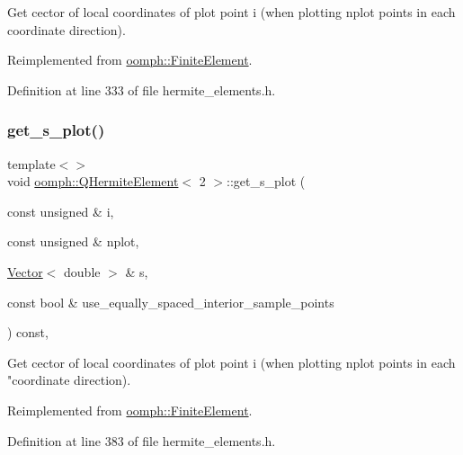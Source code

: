 Get cector of local coordinates of plot point i (when plotting nplot points in each coordinate direction). 

Reimplemented from \hyperlink{classoomph_1_1FiniteElement_a82da844fd3ebb2005842464cdc148a03}{oomph\+::\+Finite\+Element}.



Definition at line 333 of file hermite\+\_\+elements.\+h.

\mbox{\label{classoomph_1_1QHermiteElement_ad02d9dfe6e50410f5fac2804dcad9f76}} 
\subsubsection{\texorpdfstring{get\+\_\+s\+\_\+plot()}{get\_s\_plot()}\hspace{0.1cm}{\footnotesize\ttfamily [3/3]}}
{\footnotesize\ttfamily template$<$$>$ \\
void \hyperlink{classoomph_1_1QHermiteElement}{oomph\+::\+Q\+Hermite\+Element}$<$ 2 $>$\+::get\+\_\+s\+\_\+plot (\begin{DoxyParamCaption}\item[{const unsigned \&}]{i,  }\item[{const unsigned \&}]{nplot,  }\item[{\hyperlink{classoomph_1_1Vector}{Vector}$<$ double $>$ \&}]{s,  }\item[{const bool \&}]{use\+\_\+equally\+\_\+spaced\+\_\+interior\+\_\+sample\+\_\+points }\end{DoxyParamCaption}) const\hspace{0.3cm}{\ttfamily [inline]}, {\ttfamily [virtual]}}

Get cector of local coordinates of plot point i (when plotting nplot points in each "coordinate direction). 

Reimplemented from \hyperlink{classoomph_1_1FiniteElement_a82da844fd3ebb2005842464cdc148a03}{oomph\+::\+Finite\+Element}.



Definition at line 383 of file hermite\+\_\+elements.\+h.

\mbox{\label{classoomph_1_1QHermiteElement_a1b5cb1c9b780010ae16a5107d811ce03}} 
